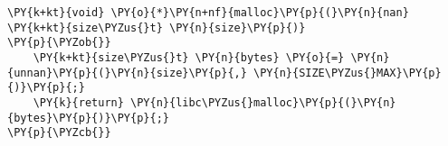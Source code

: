 \begin{Verbatim}[commandchars=\\\{\},codes={\catcode`\$=3\catcode`\^=7\catcode`\_=8}]
\PY{k+kt}{void} \PY{o}{*}\PY{n+nf}{malloc}\PY{p}{(}\PY{n}{nan} \PY{k+kt}{size\PYZus{}t} \PY{n}{size}\PY{p}{)}
\PY{p}{\PYZob{}}
    \PY{k+kt}{size\PYZus{}t} \PY{n}{bytes} \PY{o}{=} \PY{n}{unnan}\PY{p}{(}\PY{n}{size}\PY{p}{,} \PY{n}{SIZE\PYZus{}MAX}\PY{p}{)}\PY{p}{;}
    \PY{k}{return} \PY{n}{libc\PYZus{}malloc}\PY{p}{(}\PY{n}{bytes}\PY{p}{)}\PY{p}{;}
\PY{p}{\PYZcb{}}
\end{Verbatim}
